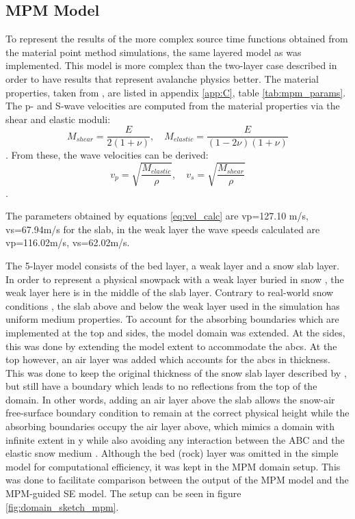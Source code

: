 \subsection{MPM Model}
\label{sec:mpm_model}
To represent the results of the more complex source time functions obtained from the material point method simulations, the same layered model as \cite{trottetTransitionSubRayleighAnticrack2022} was implemented. This model is more complex than the two-layer case described in order to have results that represent avalanche physics better. The material properties, taken from \cite{trottetTransitionSubRayleighAnticrack2022}, are listed in appendix \ref{app:C}, table \ref{tab:mpm_params}. The p- and S-wave velocities are computed from the material properties via the shear and elastic moduli: \begin{equation}
    M_{shear} = \frac{E}{2  (1 + \nu)}, \quad M_{elastic} = \frac{E}{(1 - 2  \nu) (1 + \nu)}
\end{equation} \parencite{kAkiRichards19801981}. From these, the wave velocities can be derived: \begin{equation}
    v_p = \sqrt{\frac{M_{elastic}}{\rho}}, \quad 
    v_s = \sqrt{\frac{M_{shear}}{\rho}}
    \label{eq:vel_calc}
\end{equation} \parencite{kAkiRichards19801981}.  \par

The parameters obtained by equations \ref{eq:vel_calc} are vp=127.10 m/s, vs=67.94m/s for the slab, in the weak layer the wave speeds calculated are vp=116.02m/s, vs=62.02m/s. \par

The 5-layer model consists of the bed layer, a weak layer and a snow slab layer. In order to represent a physical snowpack with a weak layer buried in snow \parencite{schweizerSnowAvalancheFormation2003}, the weak layer here is in the middle of the slab layer. Contrary to real-world snow conditions \parencite{barteltPhysicalSNOWPACKModel2002}, the slab above and below the weak layer used in the simulation has uniform medium properties. To account for the absorbing boundaries which are implemented at the top and sides, the model domain was extended. At the sides, this was done by extending the model extent to accommodate the abcs. At the top however, an air layer was added which accounts for the abcs in thickness. This was done to keep the original thickness of the snow slab layer described by \cite{trottetTransitionSubRayleighAnticrack2022}, but still have a boundary which leads to no reflections from the top of the domain. In other words, adding an air layer above the slab allows the snow-air free-surface boundary condition to remain at the correct physical height while the absorbing boundaries occupy the air layer above, which mimics a domain with infinite extent in y while also avoiding any interaction between the ABC and the elastic snow medium \parencite{afanasievSalvusFlexibleHighperformance2017}. Although the bed (rock) layer was omitted in the simple model for computational efficiency, it was kept in the MPM domain setup. This was done to facilitate comparison between the output of the MPM model and the MPM-guided SE model. The setup can be seen in figure \ref{fig:domain_sketch_mpm}. 

